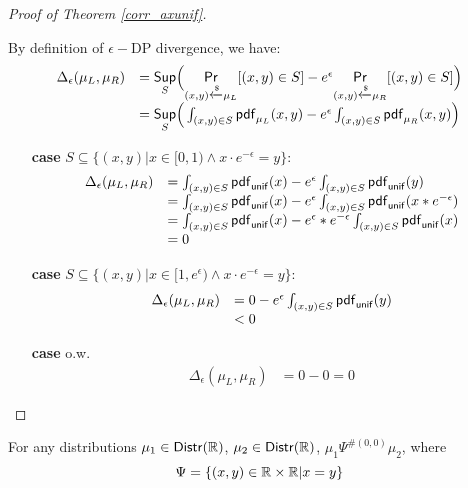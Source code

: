 \documentclass[a4paper,11pt]{article}
\begin{document}
\begin{proof}[Proof of Theorem \ref{corr_axunif}]
\begin{itemize}
	By definition of $\epsilon-$DP divergence, we have:
	 \[
	 \begin{array}{ll}
	 \Delta_{\epsilon}(\mu_L, \mu_R) 
	 & = \underset{S}{\mathsf{Sup}}
	 \Big(
	 \underset{(x,y) \xleftarrow{\$} \mu_L}{\mathsf{Pr}}[(x,y) \in S] - e^{\epsilon} \underset{(x,y) \xleftarrow{\$} \mu_R}{\mathsf{Pr}}[(x,y) \in S]
	 \Big) \\
	 & =\underset{S}{\mathsf{Sup}}
	 \Big(
	 \int_{(x,y) \in S} \mathsf{pdf}_{\mu_L}(x, y) - e^{\epsilon} \int_{(x,y) \in S} \mathsf{pdf}_{\mu_R}(x, y)
	 \Big)	 
	 \end{array}
	 \]
	 \begin{itemize}
	 	\item[{\bf case}] $S \subseteq \{(x, y) | x \in [0, 1) \land x \cdot e^{-\epsilon} = y\}$:\\
		 \[
		 \begin{array}{ll}
		 \Delta_{\epsilon}(\mu_L, \mu_R) 
		 & = 
		 \int_{(x,y) \in S} \mathsf{pdf}_{\mathsf{unif}}(x) - e^{\epsilon} \int_{(x,y) \in S} \mathsf{pdf}_{\mathsf{unif}}(y)\\
		 & = 
		 \int_{(x,y) \in S} \mathsf{pdf}_{\mathsf{unif}}(x) - e^{\epsilon} \int_{(x,y) \in S} \mathsf{pdf}_{\mathsf{unif}}(x * e^{-\epsilon})\\ 
		 & = 
		 \int_{(x,y) \in S} \mathsf{pdf}_{\mathsf{unif}}(x) - e^{\epsilon}* e^{-\epsilon} \int_{(x,y) \in S} \mathsf{pdf}_{\mathsf{unif}}(x )\\
		 & = 0 
		 \end{array}
		 \]
	 	\item[{\bf case}] $S \subseteq \{(x, y) | x \in [1, e^{\epsilon}) \land x \cdot e^{-\epsilon} = y\}$:\\
		 \[
		 \begin{array}{ll}
		 \Delta_{\epsilon}(\mu_L, \mu_R) 
		 & = 
		 0 - e^{\epsilon} \int_{(x,y) \in S} \mathsf{pdf}_{\mathsf{unif}}(y)\\
		 & <  0 
		 \end{array}
		 \]
	 	\item[{\bf case}] o.w.\\
		 \[
		 \begin{array}{ll}
		 \Delta_{\epsilon}(\mu_L, \mu_R) 
		 & = 0 - 0 =  0 
		 \end{array}
		 \]	 	
	 \end{itemize}

\end{itemize}
\end{proof}
\begin{thm}
\label{corr_axnull}
For any distributions $\mu_1 \in \mathsf{Distr}(\mathbb{R})$, $\mu_2 \in \mathsf{Distr}(\mathbb{R})$, $\mu_1 \Psi^{\#(0, 0)} \mu_2$, where
\[
	\Psi = \{(x,y) \in \mathbb{R} \times \mathbb{R} | x = y \}
\]
\end{thm}
\end{document}
